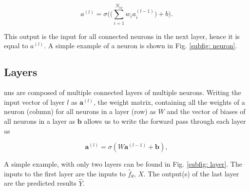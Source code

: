         \begin{equation}
            \label{eq: feed forward}
            a^{(l)} = \sigma\bigg(\big(\sum_{i = 1}^{N_{in}} w_i a_i^{(l-1)}\big) + b\bigg).
        \end{equation}

        This output is the input for all connected \glspl{neuron} in the next layer, hence it is equal to $a^{(l)}$.
        A simple example of a \gls{neuron} is shown in Fig. \ref{subfig: neuron}.

    \subsection{Layers}
        \glspl{nn} are composed of multiple connected layers of multiple \glspl{neuron}. %
        Writing the input vector of layer $l$ as $\mathbf{a}^{(l)}$, the weight matrix, containing all the weights of a \gls{neuron} (column) for all \glspl{neuron} in a layer (row) as $W$ and the vector of biases of all \glspl{neuron} in a layer as $\mathbf{b}$ allows us to write the forward pass through each layer as

        \begin{equation}
            \mathbf{a}^{(l)} = \sigma(W\mathbf{a}^{(l-1)} + \mathbf{b}),
        \end{equation}

        A simple example, with only two layers can be found in Fig. \ref{subfig: layer}. The inputs to the first layer are the inputs to $\hat{f}_\theta$, $X$. The output(s) of the last layer are the predicted results $\hat{Y}$.

